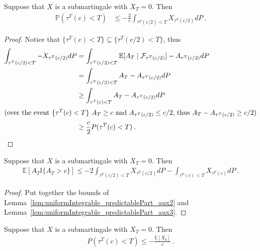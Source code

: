 \begin{lemma}\label{lem:uniformIntegrable_predictablePart_aux3}
Suppose that $X$ is a submartingale with $X_T = 0$.
Then
\begin{align*}
  \mathbb{P}(\tau^T(c) < T)
  &\le - \frac{2}{c} \int_{\tau^T(c/2) < T} X_{\tau^T(c/2)} dP
  \: .
\end{align*}
\end{lemma}

\begin{proof}
Notice that $\{\tau^T(c)<T\}\subseteq \{\tau^T(c/2)<T\}$, thus
\begin{align*}
  \int_{\tau^T(c/2)<T} -X_{\tau^T(c/2)}dP
  &=\int_{\tau^T(c/2)<T}\mathbb{E}[A_T \mid \mathcal{F}_{\tau^T(c/2)}] - A_{\tau^T(c/2)} dP
  \\
  &= \int_{\tau^T(c/2)<T}A_T - A_{\tau^T(c/2)}dP
  \\
  &\geq \int_{\tau^T(c)<T}A_T - A_{\tau^T(c/2)}dP
  \\
  \intertext{(over the event $\{\tau^T(c)<T\}$ $A_T\geq c$ and $A_{\tau^T(c/2)}\leq c/2$, thus $A_T - A_{\tau^T(c/2)}\geq c/2$)}
  &\ge \frac{c}{2}P(\tau^T(c)<T)
  \: .
\end{align*}
\end{proof}


\begin{lemma}\label{lem:uniformIntegrable_predictablePart_aux4}
Suppose that $X$ is a submartingale with $X_T = 0$.
Then
\begin{align*}
  \mathbb{E}\left[A_T \mathbb{I}\{A_T > c\} \right]
  \le - 2 \int_{\tau^T(c/2) < T} X_{\tau^T(c/2)} dP - \int_{\tau^T(c) < T} X_{\tau^T(c)} dP
  \: .
\end{align*}
\end{lemma}

\begin{proof}
Put together the bounds of Lemma~\ref{lem:uniformIntegrable_predictablePart_aux2} and Lemma~\ref{lem:uniformIntegrable_predictablePart_aux3}.
\end{proof}


\begin{lemma}\label{lem:uniformIntegrable_predictablePart_aux5}
Suppose that $X$ is a submartingale with $X_T = 0$.
Then
\begin{align*}
  P(\tau^T(c) < T) \le -\frac{\mathbb{E}[X_0]}{c} \: .
\end{align*}
\end{lemma}

